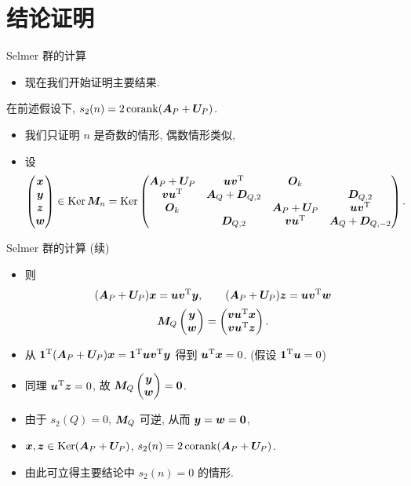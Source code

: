 \documentclass[aspectratio=169]{ctexbeamer}
\begin{document}
\section{结论证明}
\begin{frame}{Selmer 群的计算}
	\begin{itemize}
		\item 现在我们开始证明主要结果.
	\end{itemize}
	\onslide<+->
	\begin{lemma}
		在前述假设下, $s_2(n)=2\corank(\bfA_P+\bfU_P)$.
	\end{lemma}
	\begin{itemize}
		\item 我们只证明 $n$ 是奇数的情形, 偶数情形类似,
		\item 设
		\[
			\begin{pmatrix}
				\bfx\\\bfy\\\bfz\\\bfw
			\end{pmatrix}\in\Ker\bfM_n
			=\Ker\begin{pmatrix}
				\bfA_P+\bfU_P&\bfu\bfv^\rmT&\bfO_k&\\
				\bfv\bfu^\rmT&\bfA_Q+\bfD_{Q,2}&&\bfD_{Q,2}\\
				\bfO_k&&\bfA_P+\bfU_P&\bfu\bfv^\rmT\\
				&\bfD_{Q,2}&\bfv\bfu^\rmT&\bfA_Q+\bfD_{Q,-2}
			\end{pmatrix}.
		\]
	\end{itemize}
\end{frame}
	

\begin{frame}{Selmer 群的计算 (续)}
	\begin{itemize}
		\item 
		则
		\[
			(\bfA_P+\bfU_P)\bfx=\bfu\bfv^\rmT\bfy,\qquad
			(\bfA_P+\bfU_P)\bfz=\bfu\bfv^\rmT\bfw
		\]
		\[
			\bfM_Q\begin{pmatrix}
				\bfy\\\bfw
			\end{pmatrix}
			=\begin{pmatrix}
				\bfv\bfu^\rmT\bfx\\
				\bfv\bfu^\rmT\bfz
			\end{pmatrix}.
		\]
		\item 从 ${\bf1}^\rmT(\bfA_P+\bfU_P)\bfx={\bf1}^\rmT\bfu\bfv^\rmT\bfy$ 得到 $\bfu^\rmT\bfx=0$. \hfill (假设 ${\bf1}^\rmT\bfu=0$)
		\item 同理 $\bfu^\rmT\bfz=0$, 故 $\bfM_Q\begin{pmatrix}
				\bfy\\\bfw
			\end{pmatrix}={\bf0}$.
		\item 由于 $s_2(Q)=0$, $\bfM_Q$ 可逆, 从而 $\bfy=\bfw={\bf0}$,
		\item $\bfx,\bfz\in\Ker(\bfA_P+\bfU_P)$, $s_2(n)=2\corank(\bfA_P+\bfU_P)$.
		\item 由此可立得主要结论中 $s_2(n)=0$ 的情形.
	\end{itemize}
\end{frame}
\end{document}
